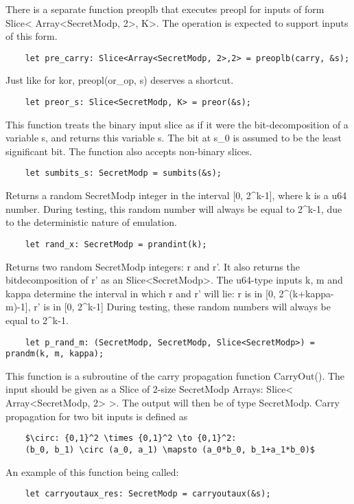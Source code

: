 There is a separate function preoplb that executes preopl for inputs of form Slice< Array<SecretModp, 2>, K>. The operation is expected to support inputs of this form. 
\begin{lstlisting}
	let pre_carry: Slice<Array<SecretModp, 2>,2> = preoplb(carry, &s);
\end{lstlisting}


Just like for kor, preopl(or_op, s) deserves a shortcut.
\begin{lstlisting}
	let preor_s: Slice<SecretModp, K> = preor(&s);
\end{lstlisting}

This function treats the binary input slice as if it were the bit-decomposition of a variable s, and returns this variable s. The bit at s_0 is assumed to be the least significant bit. The function also accepts non-binary slices.
\begin{lstlisting}
	let sumbits_s: SecretModp = sumbits(&s);
\end{lstlisting}

Returns a random SecretModp integer in the interval [0, 2^k-1], where k is a u64 number. 
During testing, this random number will always be equal to 2^k-1, due to the deterministic nature of emulation.
\begin{lstlisting}
	let rand_x: SecretModp = prandint(k);
\end{lstlisting}

Returns two random SecretModp integers: r and r'. It also returns the bitdecomposition of r' as an Slice<SecretModp>. The u64-type inputs k, m and kappa determine the interval in which r and r' will lie: r is in [0, 2^(k+kappa-m)-1], r' is in [0, 2^k-1]
During testing, these random numbers will always be equal to 2^k-1.
\begin{lstlisting}
	let p_rand_m: (SecretModp, SecretModp, Slice<SecretModp>) = prandm(k, m, kappa);
\end{lstlisting}

This function is a subroutine of the carry propagation function CarryOut(). The input should be given as a Slice of 2-size SecretModp Arrays: Slice< Array<SecretModp, 2> >. The output will then be of type SecretModp. 
Carry propagation for two bit inputs is defined as
\begin{lstlisting}
	$\circ: {0,1}^2 \times {0,1}^2 \to {0,1}^2: 
	(b_0, b_1) \circ (a_0, a_1) \mapsto (a_0*b_0, b_1+a_1*b_0)$
\end{lstlisting}
An example of this function being called:
\begin{lstlisting}
	let carryoutaux_res: SecretModp = carryoutaux(&s);
\end{lstlisting}

